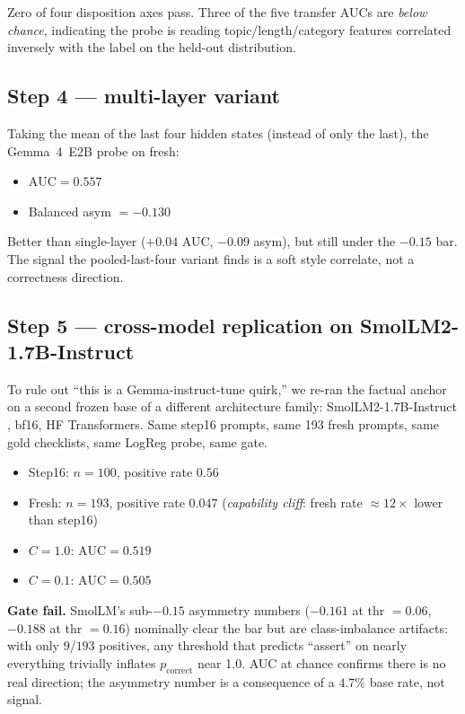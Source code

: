 \documentclass[11pt,a4paper]{article}
\begin{document}
Zero of four disposition axes pass. Three of the five transfer AUCs are \emph{below chance}, indicating the probe is reading topic/length/category features correlated inversely with the label on the held-out distribution.

\subsection{Step 4 --- multi-layer variant}

Taking the mean of the last four hidden states (instead of only the last), the Gemma~4~E2B probe on fresh:

\begin{itemize}[leftmargin=*]
\item $\text{AUC} = 0.557$
\item Balanced asym $= -0.130$
\end{itemize}

Better than single-layer ($+0.04$ AUC, $-0.09$ asym), but still under the $-0.15$ bar. The signal the pooled-last-four variant finds is a soft style correlate, not a correctness direction.

\subsection{Step 5 --- cross-model replication on SmolLM2-1.7B-Instruct}

To rule out ``this is a Gemma-instruct-tune quirk,'' we re-ran the factual anchor on a second frozen base of a different architecture family: SmolLM2-1.7B-Instruct \cite{allal2024smollm}, bf16, HF Transformers. Same step16 prompts, same 193 fresh prompts, same gold checklists, same LogReg probe, same gate.

\begin{itemize}[leftmargin=*]
\item Step16: $n = 100$, positive rate $0.56$
\item Fresh: $n = 193$, positive rate $\mathbf{0.047}$ (\emph{capability cliff}: fresh rate $\approx 12\times$ lower than step16)
\item $C = 1.0$: $\text{AUC} = 0.519$
\item $C = 0.1$: $\text{AUC} = 0.505$
\end{itemize}

\textbf{Gate fail.} SmolLM's sub-$-0.15$ asymmetry numbers ($-0.161$ at thr $= 0.06$, $-0.188$ at thr $= 0.16$) nominally clear the bar but are class-imbalance artifacts: with only $9/193$ positives, any threshold that predicts ``assert'' on nearly everything trivially inflates $p_{\text{correct}}$ near 1.0. AUC at chance confirms there is no real direction; the asymmetry number is a consequence of a $4.7\%$ base rate, not signal.
\end{document}
